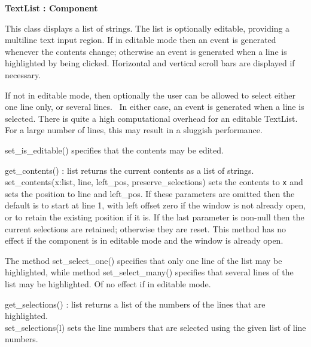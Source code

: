{\sffamily\bfseries
{}TextList : Component}

This class displays a list of strings. The list is optionally editable,
providing a multiline text input region. If in editable mode then an
event is generated whenever the contents change; otherwise an event is
generated when a line is highlighted by being clicked. Horizontal and
vertical scroll bars are displayed if necessary.

If not in editable mode, then optionally the user can be allowed to
select either one line only, or several lines. \ In either case, an
event is generated when a line is selected. There is quite a high
computational overhead for an editable TextList. For a large number of
lines, this may result in a sluggish performance.

set\_is\_editable() specifies that the contents may be edited.

get\_contents() : list returns the current contents as a list of
strings.\\
set\_contents(x:list, line, left\_pos, preserve\_selections) sets the
contents to \texttt{x} and sets the position to line and left\_pos. If
these parameters are omitted then the default is to start at line 1,
with left offset zero if the window is not already open, or to retain
the existing position if it is. If the last parameter is non-null then
the current selections are retained; otherwise they are reset. This
method has no effect if the component is in editable mode and the
window is already open.


The method set\_select\_one() specifies that only one line of the list may be
highlighted, while method set\_select\_many() specifies that several lines of
the list may be highlighted. Of no effect if in editable mode.

get\_selections() : list returns a list of the numbers of the lines that
are highlighted.\\
set\_selections(l) sets the line numbers that are selected using the
given list of line numbers.


